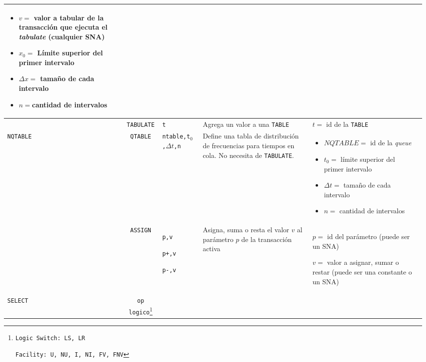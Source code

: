\documentclass[12pt, a4paper, twoside]{paquetes-apunte/apunte}
\providecommand{\tabularnewline}{\\}
\begin{document}
\begin{longtable}{|lc>{\raggedright}p{3cm}|>{\raggedright}p{5cm}|>{\raggedright}p{7cm}|>{\raggedright}p{4cm}|}
\begin{itemize}
\item $v=$ valor a tabular de la transacción que ejecuta el \emph{tabulate}
(cualquier SNA)
\item $x_{0}=$ Límite superior del primer intervalo
\item $\Delta x=$ tamaño de cada intervalo
\item $n=$cantidad de intervalos\end{itemize}
 & \tabularnewline
\hline 
 & \texttt{TABULATE} & \texttt{t} & Agrega un valor a una \texttt{TABLE} & $t=$ id de la \texttt{TABLE} & \tabularnewline
\hline 
\texttt{NQTABLE} & \texttt{QTABLE} & \texttt{ntable,t$_{0}$,$\Delta t$,n} & Define una tabla de distribución de frecuencias para tiempos en cola.
No necesita de \texttt{TABULATE}. & \begin{itemize}
\item $NQTABLE=$ id de la\emph{ queue}
\item $t_{0}=$ límite superior del primer intervalo
\item $\Delta t=$ tamaño de cada intervalo
\item $n=$ cantidad de intervalos\end{itemize}
 & \tabularnewline
\hline 
 & \texttt{ASSIGN} & \texttt{p,v}

\texttt{p+,v}

\texttt{p-,v} & Asigna, suma o resta el valor $v$ al parámetro $p$ de la transacción
activa & $p=$ id del parámetro (puede ser un SNA)

$v=$ valor a asignar, sumar o restar (puede ser una constante o un
SNA) & \tabularnewline
\hline 
\texttt{SELECT} & \texttt{op logico}\footnote{\texttt{Logic Switch: LS, LR}

\texttt{Facility: U, NU, I, NI, FV, FNV}

}
\end{longtable}
\end{document}
